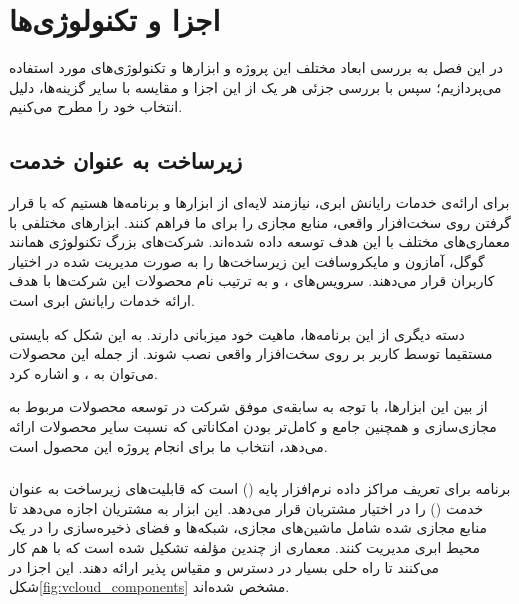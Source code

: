 \chapter{اجزا و تکنولوژی‌ها}
در این فصل به بررسی ابعاد مختلف این پروژه و ابزار‌ها و تکنولوژی‌های مورد استفاده می‌پردازیم؛ سپس با بررسی  جزئی هر یک از این اجزا و مقایسه با سایر گزینه‌ها، دلیل انتخاب خود را مطرح می‌کنیم.

\section{زیرساخت به عنوان خدمت}
برای ارائه‌ی خدمات رایانش ابری، نیازمند لایه‌ای از ابزارها و برنامه‌ها هستیم که با قرار گرفتن روی سخت‌افزار واقعی، منابع مجازی را برای ما فراهم کنند. ابزارهای مختلفی با معماری‌های مختلف با این هدف توسعه داده شده‌اند. شرکت‌های بزرگ تکنولوژی همانند گوگل، آمازون و مایکروسافت این زیرساخت‌ها را به صورت مدیریت شده در اختیار کاربران قرار می‌دهند. سرویس‌های ،  و  به ترتیب نام محصولات این شرکت‌ها با هدف ارائه خدمات رایانش ابری است.

دسته دیگری از این برنامه‌ها، ماهیت خود میزبانی دارند. به این شکل که بایستی مستقیما توسط کاربر بر روی سخت‌افزار واقعی نصب شوند. از جمله این محصولات می‌توان به ،   و  اشاره کرد.

از بین این ابزارها، با توجه به سابقه‌ی موفق شرکت  در توسعه محصولات مربوط به مجازی‌سازی و همچنین جامع و کامل‌تر بودن امکاناتی که  نسبت سایر محصولات ارائه می‌دهد، انتخاب ما برای انجام پروژه این محصول است.

\clearpage
\subsection{}
برنامه  برای تعریف مراکز داده نرم‌افزار پایه () است که قابلیت‌های زیرساخت به عنوان خدمت () را در اختیار مشتریان قرار می‌دهد. این ابزار به مشتریان اجازه می‌دهد تا منابع مجازی شده شامل ماشین‌های مجازی، شبکه‌ها و فضای ذخیره‌سازی را در یک محیط ابری مدیریت کنند. معماری  از چندین مؤلفه تشکیل شده است که با هم کار می‌کنند تا راه حلی بسیار در دسترس و مقیاس پذیر ارائه دهند. این اجزا در شکل\ref{fig:vcloud_components} مشخص شده‌اند.

